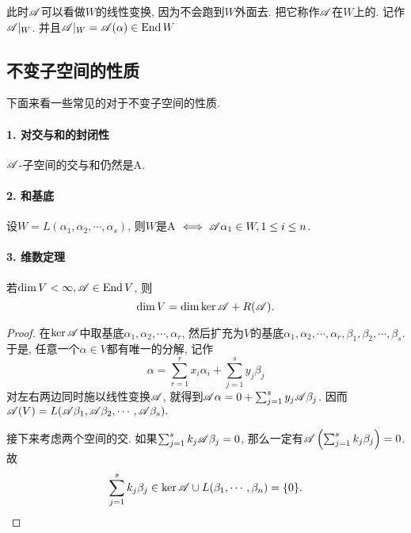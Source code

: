 \documentclass{ctexart}
\begin{document}
此时${\mathscr A}$可以看做$W$的线性变换, 因为不会跑到$W$外面去. 把它称作${\mathscr A}$在$W$上的. 记作${\mathscr A} |_W$. 并且${\mathscr A} |_W={\mathscr A} (\alpha)\in \operatorname{End} W$

\subsection{不变子空间的性质} 下面来看一些常见的对于不变子空间的性质. 

\paragraph{1. 对交与和的封闭性}  ${\mathscr A}$-子空间的交与和仍然是\zkj A. 

\paragraph{2. 和基底} 设$W=L(\alpha_1,\alpha_2, \cdots, \alpha_s)$, 则$W$是\zkj A $\iff {\mathscr A} \alpha_1\in W,1\leq i\leq n$.

\paragraph{3. 维数定理} 若$\dim V< \infty, {\mathscr A}\in \operatorname{End} V$, 则
\[
    \dim V = \dim \ker {\mathscr A} + R({\mathscr A}).
\]
\begin{proof}
    在$\ker {\mathscr A}$中取基底$\alpha_1, \alpha_2, \cdots, \alpha_r$, 然后扩充为$V$的基底$\alpha_1, \alpha_2, \cdots, \alpha_r,\beta_1,\beta_2,\cdots, \beta_s$. 于是, 任意一个$\alpha\in V$都有唯一的分解, 记作
    \[
        \alpha=\sum_{r=1}^{r}x_i\alpha_i+\sum_{j=1}^{s}y_j\beta_j
    \]
    对左右两边同时施以线性变换${\mathscr A}$, 就得到${\mathscr A}\alpha=0+\sum_{j=1}^{s}y_j{\mathscr A}\beta_j$. 因而${\mathscr A} (V)=L({\mathscr A}\beta_1, {\mathscr A}\beta_2,\cdots, {\mathscr A}\beta_s).$ 

    接下来考虑两个空间的交. 如果$\sum_{j=1}^{s}k_j{\mathscr A}\beta_j=0$, 那么一定有${\mathscr A}\left(\sum_{j=1}^{s}k_j\beta_j\right)=0$. 故
    \[
        \sum_{j=1}^{s}k_j\beta_j\in \ker {\mathscr A} \cup L(\beta_1, \cdots, \beta_n)=\{0\}.
    \]
\end{proof}
\end{document}
